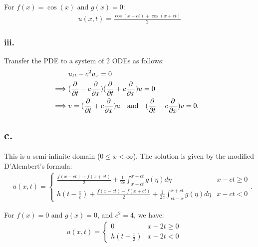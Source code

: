 \documentclass{article}
\begin{document}
For $f(x) = \cos(x)$ and $g(x) = 0$:
\begin{align*}
  u(x,t) = \frac{\cos(x-ct) + \cos(x+ct)}{2}
\end{align*}

\subsubsection*{iii.}
Transfer the PDE to a system of 2 ODEs as follows:
\begin{align*}
  &u_{tt} - c^2 u_x = 0 &&\\
  \implies& (\pdv{}{t} - c \pdv{}{x}) (\pdv{}{t} + c \pdv{}{x}) u = 0 &&\\
  \implies& v = (\pdv{}{t} + c \pdv{}{x}) u
  \quad \text{and} \quad
  (\pdv{}{t} - c \pdv{}{x}) v = 0.
\end{align*}

\newpage

\subsection*{c.}
This is a semi-infinite domain ($0 \leq x < \infty$).
The solution is given by the modified D'Alembert's formula:
\begin{align*}
  &u(x,t) = \begin{cases}
    \frac{f(x-ct) + f(x+ct)}{2} + \frac{1}{2c} \int_{x-ct}^{x+ct} g(\eta) d\eta & x-ct \geq 0 \\
    h(t-\frac{x}{c}) + \frac{f(x-ct) - f(x+ct)}{2} + \frac{1}{2c} \int_{ct-x}^{x+ct} g(\eta) d\eta & x-ct < 0
  \end{cases}.
\end{align*}

For $f(x) = 0$ and $g(x) = 0$, and $c^2 = 4$, we have:
\begin{align*}
  u(x,t) = \begin{cases}
    0 & x-2t \geq 0 \\
    h(t-\frac{x}{2}) & x-2t < 0
  \end{cases} &&\\
\end{align*}
\end{document}
